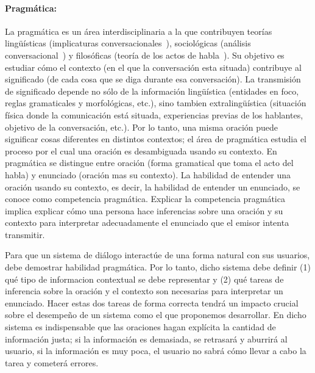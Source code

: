 \paragraph{Pragm\'atica:} La pragm\'atica es un \'area interdisciplinaria a
la que contribuyen teor\'ias ling\"u\'isticas (implicaturas
conversacionales~\citep{Grice75}), sociol\'ogicas (an\'alisis
conversa\-cio\-nal~\citep{schegloff87b}) y filos\'oficas (teor\'ia de los actos
de habla~\citep{austin62}). Su objetivo es estudiar c\'omo el contexto (en el
que la conversaci\'on esta situada) contribuye al significado (de cada cosa que
se diga durante esa conversaci\'on). La transmisi\'on de significado depende no
s\'olo de la informaci\'on ling\"u\'istica (entidades en foco, reglas
gramaticales y morfol\'ogicas, etc.), sino tambien extraling\"u\'istica
(situaci\'on f\'isica donde la comunicaci\'on est\'a situada, experiencias
previas de los hablantes, objetivo de la conversaci\'on, etc.). Por lo tanto,
una misma oraci\'on puede significar cosas diferentes en distintos contextos; el
\'area de pragm\'atica estudia el proceso por el cual una oraci\'on es
desambiguada usando su contexto. En pragm\'atica se distingue entre oraci\'on
(forma gramatical que toma el acto del habla) y enunciado (oraci\'on mas su
contexto). La habilidad de entender una oraci\'on usando su contexto, es decir,
la habilidad de entender un enunciado, se conoce como competencia pragm\'atica.
Explicar la competencia pragm\'atica implica explicar c\'omo una persona hace
inferencias sobre una oraci\'on y su contexto para interpretar adecuadamente el
enunciado que el emisor intenta transmitir. 

Para que un sistema de di\'alogo interact\'ue de una forma natural con sus
usuarios, debe demostrar habilidad pragm\'atica. Por lo tanto, dicho sistema
debe definir (1) qu\'e tipo de informacion contextual se debe representar y (2)
qu\'e tareas de inferencia sobre la oraci\'on y el contexto son necesarias para
interpretar un enunciado. Hacer estas dos tareas de forma correcta tendr\'a un
impacto crucial sobre el desempe\~no de un sistema como el que proponemos
desarrollar. En dicho sistema es indispensable que las oraciones hagan
expl\'icita la cantidad de informaci\'on justa; si la informaci\'on es
demasiada, se retrasar\'a y aburrir\'a al usuario, si la informaci\'on es muy
poca, el usuario no sabr\'a c\'omo llevar a cabo la tarea y cometer\'a errores. 

%
%

